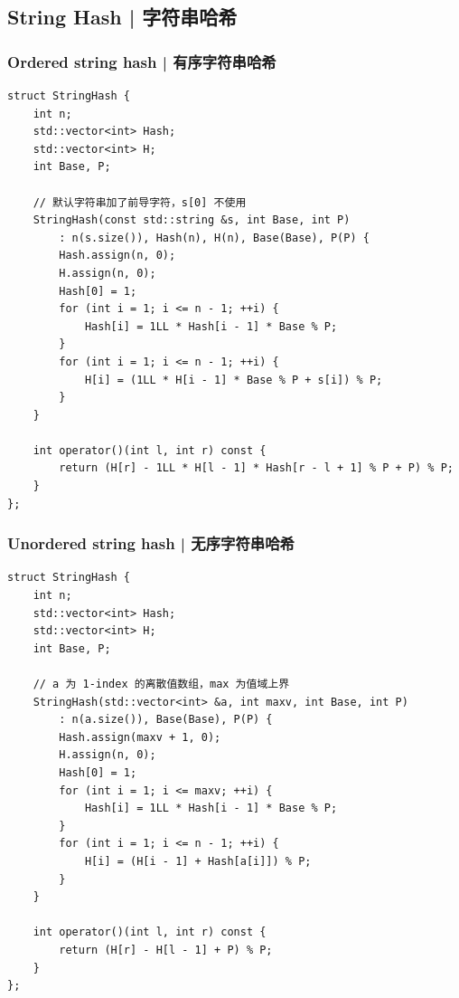 
\subsection{String Hash | 字符串哈希}


    \subsubsection{Ordered string hash | 有序字符串哈希}

        \begin{lstlisting}
struct StringHash {
    int n;
    std::vector<int> Hash;
    std::vector<int> H;
    int Base, P;

    // 默认字符串加了前导字符，s[0] 不使用
    StringHash(const std::string &s, int Base, int P)
        : n(s.size()), Hash(n), H(n), Base(Base), P(P) {
        Hash.assign(n, 0);
        H.assign(n, 0);
        Hash[0] = 1;
        for (int i = 1; i <= n - 1; ++i) {
            Hash[i] = 1LL * Hash[i - 1] * Base % P;
        }
        for (int i = 1; i <= n - 1; ++i) {
            H[i] = (1LL * H[i - 1] * Base % P + s[i]) % P;
        }
    }

    int operator()(int l, int r) const {
        return (H[r] - 1LL * H[l - 1] * Hash[r - l + 1] % P + P) % P;
    }
};
        \end{lstlisting}

    \subsubsection{Unordered string hash | 无序字符串哈希}

        \begin{lstlisting}
struct StringHash {
    int n;
    std::vector<int> Hash;
    std::vector<int> H;
    int Base, P;

    // a 为 1-index 的离散值数组，max 为值域上界
    StringHash(std::vector<int> &a, int maxv, int Base, int P)
        : n(a.size()), Base(Base), P(P) {
        Hash.assign(maxv + 1, 0);
        H.assign(n, 0);
        Hash[0] = 1;
        for (int i = 1; i <= maxv; ++i) {
            Hash[i] = 1LL * Hash[i - 1] * Base % P;
        }
        for (int i = 1; i <= n - 1; ++i) {
            H[i] = (H[i - 1] + Hash[a[i]]) % P;
        }
    }

    int operator()(int l, int r) const {
        return (H[r] - H[l - 1] + P) % P;
    }
};
        \end{lstlisting}

